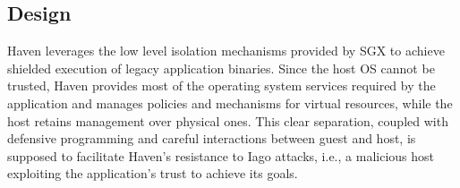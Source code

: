 %
%
%
%
%

\subsection{Design}
%
%
%
Haven leverages the low level isolation mechanisms provided by SGX to achieve shielded execution of legacy application binaries.
Since the host OS cannot be trusted, Haven provides most of the operating system services required by the application and manages policies and mechanisms for virtual resources, while the host retains management over physical ones.
This clear separation, coupled with defensive programming and careful interactions between guest and host, is supposed to facilitate Haven's resistance to Iago attacks, i.e., a malicious host exploiting the application's trust to achieve its goals.

